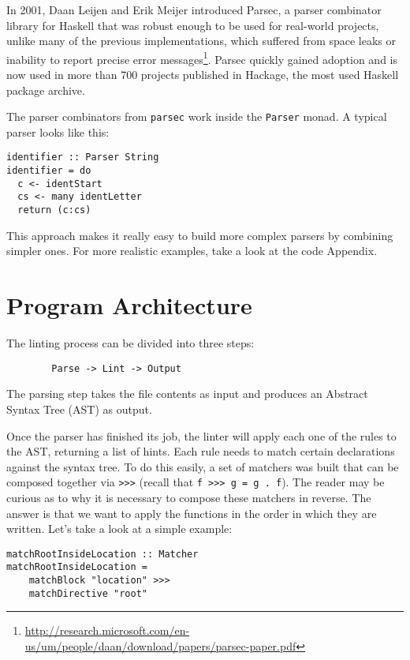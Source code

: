 \documentclass[]{article}
\begin{document}
In 2001, Daan Leijen and Erik Meijer introduced Parsec, a parser combinator
library for Haskell that was robust enough to be used for real-world projects,
unlike many of the previous implementations, which suffered from space leaks
or inability to report precise error messages\footnote{\url{http://research.microsoft.com/en-us/um/people/daan/download/papers/parsec-paper.pdf}}.
Parsec quickly gained adoption and is now used in more than 700 projects
published in Hackage, the most used Haskell package archive.

The parser combinators from \texttt{parsec} work inside the \texttt{Parser} monad.
A typical parser looks like this:

\begin{lstlisting}
identifier :: Parser String
identifier = do
  c <- identStart
  cs <- many identLetter
  return (c:cs)
\end{lstlisting}

This approach makes it really easy to build more complex parsers by combining
simpler ones. For more realistic examples, take a look at the code Appendix.

\section{Program Architecture}\label{program-architecture}

The linting process can be divided into three steps:

\begin{verbatim}
        Parse -> Lint -> Output
\end{verbatim}

The parsing step takes the file contents as input and produces an
Abstract Syntax Tree (AST) as output.

Once the parser has finished its job, the linter will apply each one of
the rules to the AST, returning a list of hints. Each rule needs to
match certain declarations against the syntax tree. To do this easily, a
set of matchers was built that can be composed together via
\texttt{\textgreater{}\textgreater{}\textgreater{}} (recall that
\texttt{f\ \textgreater{}\textgreater{}\textgreater{}\ g\ =\ g\ .\ f}).
The reader may be curious as to why it is necessary to compose these matchers
in reverse. The answer is that we want to apply the functions in the order in
which they are written. Let's take a look at a simple example:

\begin{minipage}{\linewidth}
\begin{lstlisting}[basicstyle=\ttfamily]
matchRootInsideLocation :: Matcher
matchRootInsideLocation =
    matchBlock "location" >>>
    matchDirective "root"
\end{lstlisting}
\end{minipage}
\end{document}
